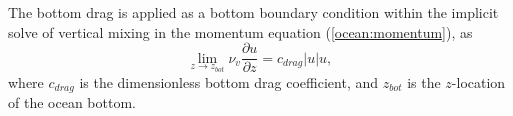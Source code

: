 The bottom drag is applied as a bottom boundary condition within the implicit solve of vertical mixing in the momentum equation (\ref{ocean:momentum}), as
\begin{equation}
\lim_{z\rightarrow z_{bot}} \nu_v \frac{\partial u}{\partial z} = c_{drag} \left|u\right| u,
\end{equation}
where $c_{drag}$ is the dimensionless bottom drag coefficient, and $z_{bot}$ is the $z$-location of the ocean bottom.
